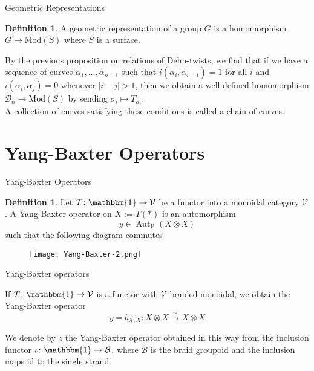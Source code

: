 \documentclass{beamer}
\theoremstyle{definition}
\newtheorem{df}[thm]{Definition}
\theoremstyle{remark}
\DeclareMathOperator{\Aut}{Aut}
\newcommand{\id}{{\mathrm{id}}}
\newcommand{\Mod}{{\mathrm{Mod}}}
\begin{document}
\begin{frame}{Geometric Representations}
    \begin{df}
        A geometric representation of a group $G$ is a homomorphism
        $G \to \Mod(S)$ where $S$ is a surface.
    \end{df}

    By the previous proposition on relations of Dehn-twists, we
    find that
    if we have a sequence of curves
    $\alpha_1, \ldots, \alpha_{n-1}$
    such that $i (\alpha_i, \alpha_{i+1})
    = 1$ for all $i$ and
    $i (\alpha_i, \alpha_j) = 0$ whenever
    $|i-j| > 1$, then
    we obtain a well-defined homomorphism
    $\mathcal{B}_n \to \Mod(S)$ by sending
    $\sigma_i \mapsto T_{\alpha_i}$.\\

    A collection of curves satisfying
    these conditions is called
    a chain of curves.
\end{frame}

\section{Yang-Baxter Operators}

\begin{frame}{Yang-Baxter Operators}

\begin{df}
    Let $T \colon
    \mathbbm{1} \to \mathcal{V}$
    be a functor into
    a monoidal category $\mathcal{V}$.
    A Yang-Baxter operator
    on $X:=T(*)$ is an automorphism
    \[y \in \Aut_{\mathcal{V}}(X \otimes X)\]
    such that the following diagram commutes
    \begin{figure}
        \centering
        \texttt{[image: Yang-Baxter-2.png]}
        \label{fig:enter-label}
    \end{figure}
\end{df}
\end{frame}

\begin{frame}{Yang-Baxter operators}

If $T \colon  \mathbbm{1} \to
\mathcal{V}$ is a functor with
$\mathcal{V}$ braided monoidal, 
we obtain the Yang-Baxter operator
\[y = 
b_{X , X} \colon 
X \otimes X \stackrel{\sim}{\to} 
X \otimes X\]

We denote by
$z$ the Yang-Baxter operator
obtained in this way
from the inclusion functor
$\iota \colon \mathbbm{1} \to
\mathcal{B}$, where
$\mathcal{B}$ is the braid groupoid
and the inclusion maps
$\id$ to the single strand.
\end{frame}
\end{document}
